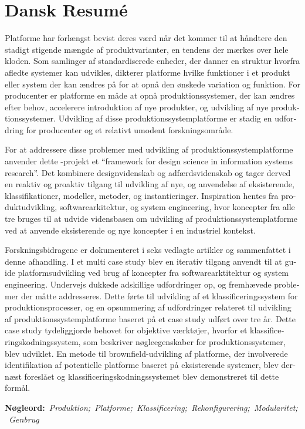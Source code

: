 \chapter*{Dansk Resumé}\label{DKresume}
\begin{otherlanguage}{danish}
Platforme har forlængst bevist deres værd når det kommer til at håndtere den stadigt stigende mængde af produktvarianter, en tendens der mærkes over hele kloden.
Som samlinger af standardiserede enheder, der danner en struktur hvorfra afledte systemer kan udvikles, dikterer platforme hvilke funktioner i et produkt eller system der kan ændres på for at opnå den ønskede variation og funktion.
For producenter er platforme en måde at opnå produktionssystemer, der kan ændres efter behov, accelerere introduktion af nye produkter, og udvikling af nye produktionssystemer.
Udvikling af disse produktionssystemplatforme er stadig en udfordring for producenter og et relativt umodent forskningsområde.

For at addressere disse problemer med udvikling af produktionssystemplatforme anvender dette \PhD{}-projekt et ``framework for design science in information systems research''.
Det kombinere designvidenskab og adfærdsvidenskab og tager derved en reaktiv og proaktiv tilgang til udvikling af nye, og anvendelse af eksisterende, klassifikationer, modeller, metoder, og instantieringer.
Inspiration hentes fra produktudvikling, softwarearkitektur, og system engineering, hvor koncepter fra alle tre bruges til at udvide vidensbasen om udvikling af produktionssystemplatforme ved at anvende eksisterende og nye koncepter i en industriel kontekst.

Forskningsbidragene er dokumenteret i seks vedlagte artikler og sammenfattet i denne afhandling.
I et multi case study blev en iterativ tilgang anvendt til at guide platformsudvikling ved brug af koncepter fra softwarearktitektur og system engineering.
Undervejs dukkede adskillige udfordringer op, og fremhævede problemer der måtte addresseres.
Dette førte til udvikling af et klassificeringssystem for produktionsprocesser, og en opsummering af udfordringer relateret til udvikling af produktionssystemplatforme baseret på et case study udført over tre år.
Dette case study tydeliggjorde behovet for objektive værktøjer, hvorfor et klassificeringskodningssystem, som beskriver nøgleegenskaber for produktionssystemer, blev udviklet.
En metode til brownfield-udvikling af platforme, der involverede identifikation af potentielle platforme baseret på eksisterende systemer, blev dernæst foreslået og klassificeringskodningssystemet blev demonstreret til dette formål.

\vfill\noindent\textbf{Nøgleord:}\ \emph{Produktion;\ Platforme;\ Klassificering;\ Rekonfigurering;\ Modularitet;\ Genbrug}
\end{otherlanguage}
